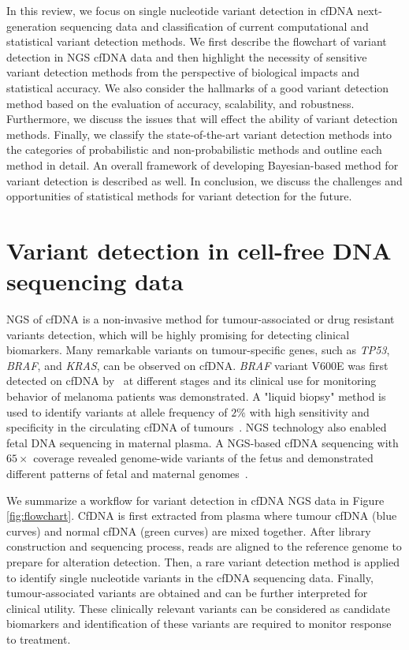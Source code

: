 \documentclass[a4,center,fleqn]{NAR}
\begin{document}
In this review, we focus on single nucleotide variant detection in cfDNA next-generation sequencing data and classification of current computational and statistical variant detection methods.
We first describe the flowchart of variant detection in NGS cfDNA data and then highlight the necessity of sensitive variant detection methods from the perspective of biological impacts and statistical accuracy.
We also consider the hallmarks of a good variant detection method based on the evaluation of accuracy, scalability, and robustness.
Furthermore, we discuss the issues that will effect the ability of variant detection methods.
Finally, we classify the state-of-the-art variant detection methods into the categories of probabilistic and non-probabilistic methods and outline each method in detail.
An overall framework of developing Bayesian-based method for variant detection is described as well.
In conclusion, we discuss the challenges and opportunities of statistical methods for variant detection for the future.

\clearpage

\section{Variant detection in cell-free DNA sequencing data}

NGS of cfDNA is a non-invasive method for tumour-associated or drug resistant variants detection, which will be highly promising for detecting clinical biomarkers. 
Many remarkable variants on tumour-specific genes, such as \textit{TP53}, \textit{BRAF}, and \textit{KRAS}, can be observed on cfDNA.
\textit{BRAF} variant V600E was first detected on cfDNA by~\citep{shinozaki2007utility} at different stages and its clinical use for monitoring behavior of melanoma patients was demonstrated.
A "liquid biopsy" method is used to identify variants at allele frequency of $2\%$ with high sensitivity and specificity in the circulating cfDNA of tumours~\citep{forshew2012noninvasive}.
NGS technology also enabled fetal DNA sequencing in maternal plasma.
A NGS-based cfDNA sequencing with $65\times$ coverage revealed genome-wide variants of the fetus and demonstrated different patterns of fetal and maternal genomes~\citep{lo2010maternal}.

We summarize a workflow for variant detection in cfDNA NGS data in Figure \ref{fig:flowchart}.
CfDNA is first extracted from plasma where tumour cfDNA (blue curves) and normal cfDNA (green curves) are mixed together.
After library construction and sequencing process, reads are aligned to the reference genome to prepare for alteration detection.
Then, a rare variant detection method is applied to identify single nucleotide variants in the cfDNA sequencing data.
Finally, tumour-associated variants are obtained and can be further interpreted for clinical utility.
These clinically relevant variants can be considered as candidate biomarkers and identification of these variants are required to monitor response to treatment.
\end{document}
